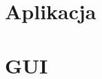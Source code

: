 \documentclass[]{report}
\begin{document}
\newpage
\section{Aplikacja}


\newpage
\section{GUI}







\end{document}
